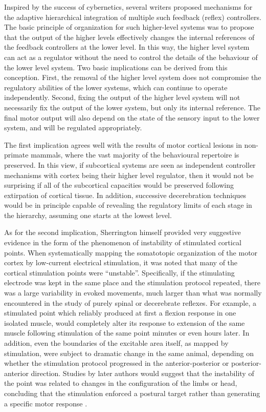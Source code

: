 Inspired by the success of cybernetics, several writers proposed mechanisms for the adaptive hierarchical integration of multiple such feedback (reflex) controllers. The basic principle of organization for such higher-level systems was to propose that the output of the higher levels effectively changes the internal references of the feedback controllers at the lower level. In this way, the higher level system can act as a regulator without the need to control the details of the behaviour of the lower level system. Two basic implications can be derived from this conception. First, the removal of the higher level system does not compromise the regulatory abilities of the lower systems, which can continue to operate independently. Second, fixing the output of the higher level system will not necessarily fix the output of the lower system, but only its internal reference. The final motor output will also depend on the state of the sensory input to the lower system, and will be regulated appropriately.

The first implication agrees well with the results of motor cortical lesions in non-primate mammals, where the vast majority of the behavioural repertoire is preserved. In this view, if subcortical systems are seen as independent controller mechanisms with cortex being their higher level regulator, then it would not be surprising if all of the subcortical capacities would be preserved following extirpation of cortical tissue. In addition, successive decerebration techniques would be in principle capable of revealing the regulatory limits of each stage in the hierarchy, assuming one starts at the lowest level.

As for the second implication, Sherrington himself provided very suggestive evidence in the form of the phenomenon of instability of stimulated cortical points. When systematically mapping the somatotopic organization of the motor cortex by low-current electrical stimulation, it was noted that many of the cortical stimulation points were ``unstable''. Specifically, if the stimulating electrode was kept in the same place and the stimulation protocol repeated, there was a large variability in evoked movements, much larger than what was normally encountered in the study of purely spinal or decerebrate reflexes. For example, a stimulated point which reliably produced at first a flexion response in one isolated muscle, would completely alter its response to extension of the same muscle following stimulation of the same point minutes or even hours later. In addition, even the boundaries of the excitable area itself, as mapped by stimulation, were subject to dramatic change in the same animal, depending on whether the stimulation protocol progressed in the anterior-posterior or posterior-anterior direction. Studies by later authors would suggest that the instability of the point was related to changes in the configuration of the limbs or head, concluding that the stimulation enforced a postural target rather than generating a specific motor response \cite{Ward1938}.

